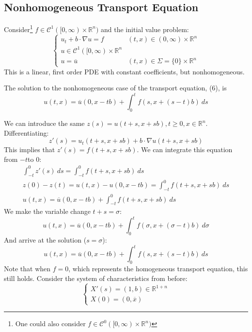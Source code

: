\documentclass[12pt]{article}
\begin{document}
\subsection{Nonhomogeneous Transport Equation}
\label{sub:linear_non_homogeneous_equations}
Consider\footnote{One could also consider $f\in\mathcal{C}^0([0,\infty)\times\mathbb{R}^n)$} $f\in\mathcal{C}^1([0,\infty)\times\mathbb{R}^{n})$ and the initial value problem:
\begin{equation}
    \begin{cases} 
        u_t+b\cdot\nabla u=f & (t,x)\in(0,\infty)\times\mathbb{R}^{n}\\
        u\in\mathcal{C}^{1}([0,\infty)\times\mathbb{R}^{n}\\
        u=\overline{u} & (t,x)\in\Sigma=\{0\}\times\mathbb{R}^{n}
    \end{cases}
\end{equation}
This is a linear, first order PDE with constant coefficients, but nonhomogeneous. 
\begin{theo}
    The solution to the nonhomogeneous case of the transport equation, (6), is 
\[
    u(t,x)=\overline{u}(0,x-tb)+\int_{0}^{t} f(s,x+(s-t)b)\: ds 
\]
\end{theo}
We can introduce the same $z(s)=u(t+s, x+sb), t\ge 0, x\in\mathbb{R}^n$. Differentiating:
\[
    z'(s)=u_t(t+s,x+sb)+b\cdot\nabla u(t+s,x+sb)
\] 
This implies that $z'(s)=f(t+s,x+sb)$. We can integrate this equation from $-t$to 0:
\begin{gather*}
    \int_{-t}^{0} z'(s)\: ds=\int_{-t}^{0} f(t+s,x+sb)\: ds\\
    z(0)-z(t)=u(t,x)-u(0,x-tb)=\int_{-t}^{0} f(t+s,x+sb)\: ds\\
    u(t,x)=\overline{u}(0,x-tb)+\int_{-t}^{0} f(t+s,x+sb)\: ds
\end{gather*}
We make the variable change $t+s=\sigma$:
\[
    u(t,x)=\overline{u}(0,x-tb)+\int_{0}^{t} f(\sigma,x+(\sigma-t)b)\: d\sigma 
\]
And arrive at the solution ($s=\sigma$):
\begin{equation}
    u(t,x)=\overline{u}(0,x-tb)+\int_{0}^{t} f(s,x+(s-t)b)\: ds 
\end{equation}
Note that when $f=0$, which represents the homogeneous transport equation, this still holds.
Consider the system of characteristics from before:
\[
    \begin{cases}
        X'(s)=(1,b)\in\mathbb{R}^{1+n}\\
        X(0)=(0,\overline{x})
    \end{cases}
\]
\end{document}
